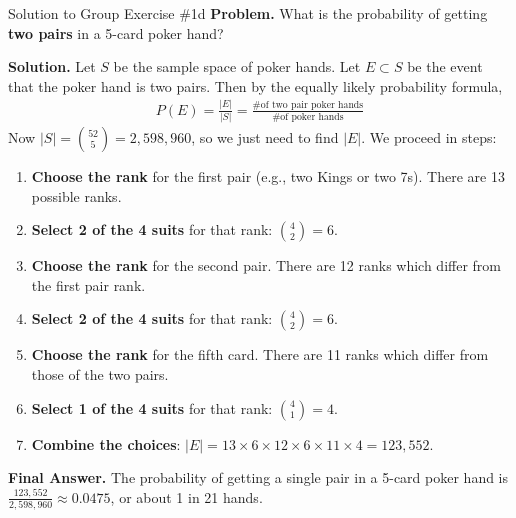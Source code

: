 \documentclass[10pt]{beamer}
\begin{document}
\begin{frame}{Solution to Group Exercise \#1d}
\footnotesize 
 \colorbox{blue!30}{\textbf{Problem.}} What is the probability of getting \textbf{two pairs} in a 5-card poker hand?
\vfill 

 \colorbox{green!30}{\textbf{Solution.}} Let $S$ be the sample space of poker hands. 
Let $E \subset S$ be the event that the poker hand is two pairs. Then by the equally likely probability formula, 
\begin{align*}
P(E) = 	\frac{|E|}{|S|} = \frac{\text{\# of two pair poker hands}}{\text{\# of poker hands}}
\end{align*}
Now $|S|=\binom{52}{5} =  2,598,960$, so we just need to find $|E|$.  We proceed in steps:

\begin{enumerate} \footnotesize 
\item \textbf{Choose the rank} for the first pair 	(e.g., two Kings or two 7s).  There are 13 possible ranks.
\item \textbf{Select 2 of the 4 suits} for that rank:  $\binom{4}{2}=6$.
\item \textbf{Choose the rank} for the second pair.  There are 12 ranks which differ from the first pair rank.
\item \textbf{Select 2 of the 4 suits} for that rank:  $\binom{4}{2}=6$.
\item \textbf{Choose the rank} for the fifth card.  There are 11 ranks which differ from those of the two pairs.
\item \textbf{Select 1 of the 4 suits} for that rank:  $\binom{4}{1}=4$.
\item \textbf{Combine the choices}:  $|E|=13 \times 6 \times 12 \times 6 \times 11 \times 4 = 123,552$.
\end{enumerate}
\vspace{-.1cm}
\alert{\textbf{Final Answer.}} The probability of getting a single pair in a 5-card poker hand is $\frac{123,552}{2,598,960} \approx 0.0475$, or about 1 in 21 hands.
\end{frame}
\end{document}
